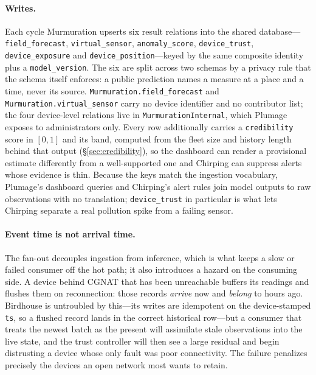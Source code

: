 \documentclass[10pt]{article}
\begin{document}
\paragraph{Writes.}
\begin{sloppypar}
Each cycle Murmuration upserts six result relations into the shared
database---%
\texttt{field\_forecast}, \texttt{virtual\_sensor}, \texttt{anomaly\_score},
\texttt{device\_trust}, \texttt{device\_exposure} and
\texttt{device\_position}---keyed by the same composite identity plus a \texttt{model\_version}.
The six are split across two schemas by a privacy rule that the schema itself
enforces: a public prediction names a measure at a place and a time, never its
source. \texttt{Murmuration.field\_forecast} and
\texttt{Murmuration.virtual\_sensor} carry no device identifier and no
contributor list; the four device-level relations live in
\texttt{MurmurationInternal}, which Plumage exposes to administrators only. Every row
additionally carries a \texttt{credibility} score in $[0,1]$ and its band,
computed from the fleet size and history length behind that output
(\S\ref{sec:credibility}), so the dashboard can render a provisional estimate
differently from a well-supported one and Chirping can suppress alerts whose
evidence is thin. Because the
keys match the ingestion vocabulary, Plumage's dashboard queries and Chirping's
alert rules join model outputs to raw observations with no translation;
\texttt{device\_trust} in particular is what lets Chirping separate a real
pollution spike from a failing sensor.
\end{sloppypar}

\paragraph{Event time is not arrival time.}
The fan-out decouples ingestion from inference, which is what keeps a slow or
failed consumer off the hot path; it also introduces a hazard on the consuming
side. A device behind CGNAT that has been unreachable buffers its readings and
flushes them on reconnection: those records \emph{arrive} now and \emph{belong} to
hours ago. Birdhouse is untroubled by this---its writes are idempotent on the
device-stamped \texttt{ts}, so a flushed record lands in the correct historical
row---but a consumer that treats the newest batch as the present will assimilate
stale observations into the live state, and the trust controller will then see a
large residual and begin distrusting a device whose only fault was poor
connectivity. The failure penalizes precisely the devices an open network most
wants to retain.
\end{document}
